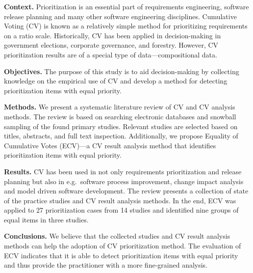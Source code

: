 
\textbf{Context.}
Prioritization is an essential part of requirements engineering, software release planning and many other software engineering disciplines.
Cumulative Voting (CV) is known as a relatively simple method for prioritizing requirements on a ratio scale.
Historically, CV has been applied in decision-making in government elections, corporate governance, and forestry.
However, CV prioritization results are of a special type of data---compositional data.

\textbf{Objectives.}
The purpose of this study is to aid decision-making by collecting knowledge on the empirical use of CV and develop a method for detecting prioritization items with equal priority.

\textbf{Methods.}
We present a systematic literature review of CV and CV analysis methods.
The review is based on searching electronic databases and snowball sampling of the found primary studies.
Relevant studies are selected based on titles, abstracts, and full text inspection.
Additionally, we propose Equality of Cumulative Votes (ECV)---a CV result analysis method that identifies prioritization items with equal priority.

\textbf{Results.}
CV has been used in not only requirements prioritization and release planning but also in e.g.\ software process improvement, change impact analysis and model driven software development.
The review presents a collection of state of the practice studies and CV result analysis methods.
In the end, ECV was applied to 27 prioritization cases from 14 studies and identified nine groups of equal items in three studies.

\textbf{Conclusions.}
We believe that the collected studies and CV result analysis methods can help the adoption of CV prioritization method.
The evaluation of ECV indicates that it is able to detect prioritization items with equal priority and thus provide the practitioner with a more fine-grained analysis.